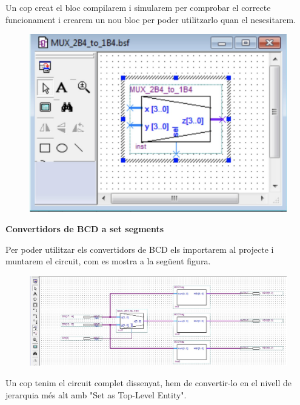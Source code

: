 \documentclass[12pt, a4papre]{article}
\begin{document}
		Un cop creat el bloc compilarem i simularem per comprobar el correcte funcionament i crearem un nou bloc per poder utilitzarlo quan el nesesitarem.
	
	\begin{figure}[H]
		\begin{center}
		\includegraphics[width=150mm]{blocnoumult.jpeg}
		\end{center}
	\end{figure}
	
	\textbf{\large{Convertidors de BCD a set segments}}
	
	Per poder utilitzar els convertidors de BCD els importarem al projecte i muntarem el circuit, com es mostra a la següent figura.
	
	\begin{figure}[H]
		\begin{center}
		\includegraphics[width=150mm]{bcd7.jpeg}
		\end{center}
	\end{figure}
	
	Un cop tenim el circuit complet dissenyat, hem de convertir-lo en el nivell de jerarquia més
alt amb "Set as Top-Level Entity".\\
\end{document}
